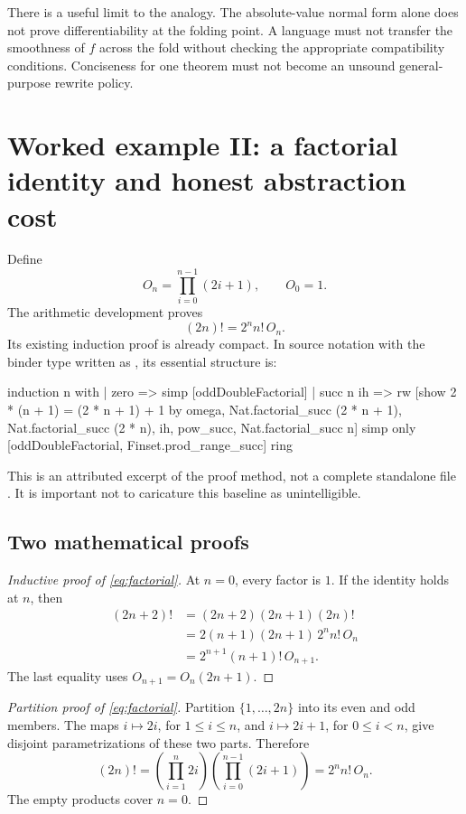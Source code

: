 \documentclass[11pt,a4paper]{article}
\newcommand{\code}[1]{\texttt{\detokenize{#1}}}
\theoremstyle{remark}
\begin{document}
There is a useful limit to the analogy. The absolute-value normal form alone does not prove differentiability at the folding point. A language must not transfer the smoothness of \(f\) across the fold without checking the appropriate compatibility conditions. Conciseness for one theorem must not become an unsound general-purpose rewrite policy.

\section{Worked example II: a factorial identity and honest abstraction cost}\label{sec:factorial}

Define
\[
 O_n=\prod_{i=0}^{n-1}(2i+1),\qquad O_0=1.
\]
The arithmetic development proves
\begin{equation}\label{eq:factorial}
 (2n)!=2^n n!\,O_n.
\end{equation}
Its existing induction proof is already compact. In source notation with the binder type written as \code{Nat}, its essential structure is:
\begin{Code}
induction n with
| zero => simp [oddDoubleFactorial]
| succ n ih =>
    rw [show 2 * (n + 1) = (2 * n + 1) + 1 by omega,
      Nat.factorial_succ (2 * n + 1),
      Nat.factorial_succ (2 * n), ih,
      pow_succ, Nat.factorial_succ n]
    simp only [oddDoubleFactorial, Finset.prod_range_succ]
    ring
\end{Code}
This is an attributed excerpt of the proof method, not a complete standalone file \cite{proveit-arithmetic}. It is important not to caricature this baseline as unintelligible.

\subsection{Two mathematical proofs}

\begin{proof}[Inductive proof of \eqref{eq:factorial}]
At \(n=0\), every factor is \(1\). If the identity holds at \(n\), then
\begin{align*}
 (2n+2)!
 &= (2n+2)(2n+1)(2n)!\\
 &=2(n+1)(2n+1)\,2^n n!\,O_n\\
 &=2^{n+1}(n+1)!\,O_{n+1}.
\end{align*}
The last equality uses \(O_{n+1}=O_n(2n+1)\).
\end{proof}

\begin{proof}[Partition proof of \eqref{eq:factorial}]
Partition \(\{1,\ldots,2n\}\) into its even and odd members. The maps
\(i\mapsto2i\), for \(1\le i\le n\), and \(i\mapsto2i+1\), for \(0\le i<n\), give disjoint parametrizations of these two parts. Therefore
\[
 (2n)!=\left(\prod_{i=1}^{n}2i\right)
          \left(\prod_{i=0}^{n-1}(2i+1)\right)
       =2^n n!\,O_n.
\]
The empty products cover \(n=0\).
\end{proof}
\end{document}
